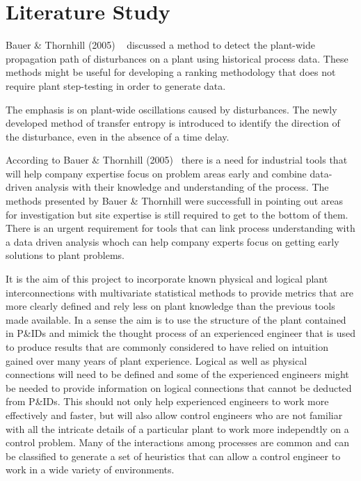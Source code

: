 \section{Literature Study}





Bauer \& Thornhill (2005) ~\cite{Bauer2005} discussed a method to detect the plant-wide propagation path of disturbances on a plant using historical process data.
These methods might be useful for developing a ranking methodology that does not require plant step-testing in order to generate data.

The emphasis is on plant-wide oscillations caused by disturbances.
The newly developed method of transfer entropy is introduced to identify the direction of the disturbance, even in the absence of a time delay.

According to Bauer \& Thornhill (2005)~\cite{Bauer2005} there is a need for industrial tools that will help company expertise focus on problem areas early and combine data-driven analysis with their knowledge and understanding of the process.
The methods presented by Bauer \& Thornhill were successfull in pointing out areas for investigation but site expertise is still required to get to the bottom of them.
There is an urgent requirement for tools that can link process understanding with a data driven analysis whoch can help company experts focus on getting early solutions to plant problems.

It is the aim of this project to incorporate known physical and logical plant interconnections with multivariate statistical methods to provide metrics that are more clearly defined and rely less on plant knowledge than the previous tools made available.
In a sense the aim is to use the structure of the plant contained in P\&IDs and mimick the thought process of an experienced engineer that is used to produce results that are commonly considered to have relied on intuition gained over many years of plant experience.
Logical as well as physical connections will need to be defined and some of the experienced engineers might be needed to provide information on logical connections that cannot be deducted from P\&IDs.
This should not only help experienced engineers to work more effectively and faster, but will also allow control engineers who are not familiar with all the intricate details of a particular plant to work more independtly on a control problem.
Many of the interactions among processes are common and can be classified to generate a set of heuristics that can allow a control engineer to work in a wide variety of environments.

